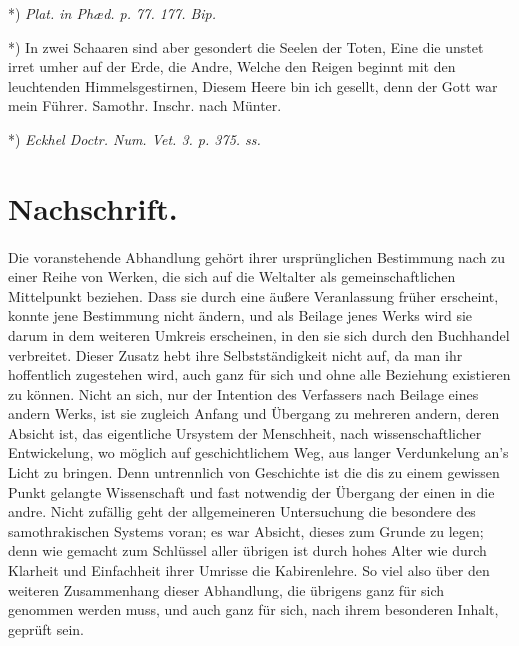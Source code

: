 \documentclass[a4paper, 11pt, oneside]{article}
\begin{document}
*) \emph{Plat. in Phæd. p. 77. 177. Bip.}

*) In zwei Schaaren sind aber gesondert die Seelen  
der Toten,  
Eine die unstet irret umher auf der Erde, die Andre,  
Welche den Reigen beginnt mit den leuchtenden Himmelsgestirnen,  
Diesem Heere bin ich gesellt, denn der Gott war mein  
Führer.  
Samothr. Inschr. nach Münter.

*) \emph{Eckhel Doctr. Num. Vet. 3. p. 375. ss.}
\clearpage
\section{Nachschrift.}
\paragraph{}
Die voranstehende Abhandlung gehört ihrer ursprünglichen Bestimmung nach zu einer Reihe von Werken, die sich auf die Weltalter als gemeinschaftlichen Mittelpunkt beziehen. Dass sie durch eine äußere Veranlassung früher erscheint, konnte jene Bestimmung nicht ändern, und als Beilage jenes Werks wird sie darum in dem weiteren Umkreis erscheinen, in den sie sich durch den Buchhandel verbreitet. Dieser Zusatz hebt ihre Selbstständigkeit nicht auf, da man ihr hoffentlich zugestehen wird, auch ganz für sich und ohne alle Beziehung existieren zu können. Nicht an sich, nur der Intention des Verfassers nach Beilage eines andern Werks, ist sie zugleich Anfang und Übergang zu mehreren andern, deren Absicht ist, das eigentliche Ursystem der Menschheit, nach wissenschaftlicher Entwickelung, wo möglich auf geschichtlichem Weg, aus langer Verdunkelung an's Licht zu bringen. Denn untrennlich von Geschichte ist die dis zu einem gewissen Punkt gelangte Wissenschaft und fast notwendig der Übergang der einen in die andre. Nicht zufällig geht der allgemeineren Untersuchung die besondere des samothrakischen Systems voran; es war Absicht, dieses zum Grunde zu legen; denn wie gemacht zum Schlüssel aller übrigen ist durch hohes Alter wie durch Klarheit und Einfachheit ihrer Umrisse die Kabirenlehre. So viel also über den weiteren Zusammenhang dieser Abhandlung, die übrigens ganz für sich genommen werden muss, und auch ganz für sich, nach ihrem besonderen Inhalt, geprüft sein.
\end{document}
